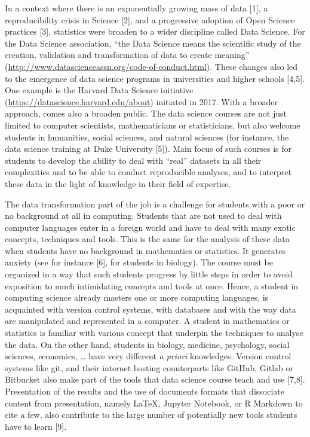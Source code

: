 \documentclass[
]{article}
\begin{document}
In a context where there is an exponentially growing mass of data
{[}1{]}, a reproducibility crisis in Science {[}2{]}, and a progressive
adoption of Open Science practices {[}3{]}, statistics were broaden to a
wider discipline called Data Science. For the Data Science association,
``the Data Science means the scientific study of the creation,
validation and transformation of data to create meaning''
(\url{http://www.datascienceassn.org/code-of-conduct.html}). These
changes also led to the emergence of data science programs in
universities and higher schools {[}4,5{]}. One example is the Harvard
Data Science initiative (\url{https://datascience.harvard.edu/about})
initiated in 2017. With a broader approach, comes also a broaden public.
The data science courses are not just limited to computer scientists,
mathematicians or statisticians, but also welcome students in
humanities, social sciences, and natural sciences (for instance, the
data science training at Duke University {[}5{]}). Main focus of such
courses is for students to develop the ability to deal with ``real''
datasets in all their complexities and to be able to conduct
reproducible analyses, and to interpret these data in the light of
knowledge in their field of expertise.

The data transformation part of the job is a challenge for students with
a poor or no background at all in computing. Students that are not used
to deal with computer languages enter in a foreign world and have to
deal with many exotic concepts, techniques and tools. This is the same
for the analysis of these data when students have no background in
mathematics or statistics. It generates anxiety (see for instance
{[}6{]}, for students in biology). The course must be organized in a way
that such students progress by little steps in order to avoid exposition
to much intimidating concepts and tools at once. Hence, a student in
computing science already masters one or more computing languages, is
acquainted with version control systems, with databases and with the way
data are manipulated and represented in a computer. A student in
mathematics or statistics is familiar with various concept that underpin
the techniques to analyse the data. On the other hand, students in
biology, medicine, psychology, social sciences, economics, \ldots{} have
very different \emph{a priori} knowledges. Version control systems like
git, and their internet hosting counterparts like GitHub, Gitlab or
Bitbucket also make part of the tools that data science course teach and
use {[}7,8{]}. Presentation of the results and the use of documents
formats that dissociate content from presentation, namely LaTeX, Jupyter
Notebook, or R Markdown to cite a few, also contribute to the large
number of potentially new tools students have to learn {[}9{]}.
\end{document}
